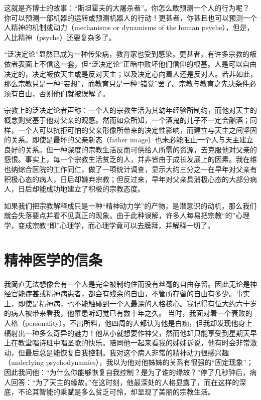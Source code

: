\documentclass[11pt,oneside]{book}
\begin{document}
\begin{common-format}
这就是齐博士的故事：“斯坦霍夫的大屠杀者”。你怎么敢预测一个人的行为呢？ 你可以预测一部机器的运转或预测机器人的行动！更甚者，你甚且也可以预测一个人精神的机制或动力（mechanisms or dynamisms of the human psyche），但是，人比精神（psyche）还要复杂多了。

“泛决定论”显然已成为一种传染病，教育家也受到感染。更甚者，有许多宗教的皈依者表面上不信这一套，但“泛决定论”正暗中败坏他们信仰的根基。人是可以自由决定的，决定皈依天主或是反对天主；以及决定心向着人还是反对人。若非如此，那么宗教只是一种“妄想”，而教育只是一种“错觉”罢了。宗教与教育之先决条件必须有自由，否则他们就被误解了。

宗教上的泛决定论者声称：一个人的宗教生活为其幼年经验所制约，而他对天主的概念则奠基于他对父亲的观感。然而如众所知，一个酒鬼的儿子不一定会酗酒；同样，一个人可以抗拒可怕的父亲形像所带来的决定性影响，而建立与天主之间坚固的关系。即使是最坏的父亲新态（father image）也未必能阻止一个人与天主建立良好的关系。但一种深度的宗教生活反而可供给人所需的资源，去克服他对父亲的怨恨。事实上，每一个宗教生活贫乏的人，并非皆由于成长发展上的因素。我在维也纳综合医院的工作同仁，做了一项统计调查，显示大约三分之一在早年对父亲有积极心态的病人，日后却嫌弃宗教；但反过来，早年对父亲具消极心态的大部分病人，日后却能成功地建立了积极的宗教态度。

如果我们把宗教解释成只是一种“精神动力学”的产物，是潜意识的动机，那么我们就会失落要点并看不见真正的现象。由于此种误解，许多人每易把宗教“的”心理学，变成宗教“即”心理学，而心理学竟可以去膜拜，并解释一切了。

\section{精神医学的信条}
我简直无法想像会有一个人是完全被制约住而没有丝毫的自由存留。因此无论是神经官能症甚或精神病患者，都会有残余的自由，不管所存留的自由有多少。事实上，即使是精神病，也不能触碰到一个人最深的人格核心。我记得有位大约六十岁的病人被带来看我，他罹患听幻觉已有数十年之久。 当时，我面对着一个衰败的人格（personality）。不出所料，他四周的人都认为他是白痴，但我却发现他身上辐射出一种多么奇异的魅力！他从小就想要作神父，然而他却只能享受到星期天早上在教堂唱诗班中唱圣歌的快乐。陪同他一起来看我的姊姊诉说，他有时会非常激动，但最后总是能恢复自我控制。我对这个病人非常的精神动力很感兴趣（underlying psychodynamics），我以为他对他姊姊的关系有很强的“固定现象”；因此我问他：“为什么你能够恢复自我控制？是为了谁的缘故？”停了几秒钟后，病人回答：“为了天主的缘故。”在这时刻，他最深处的人格显露了，而在这样的深底，不论其智能的秉赋是多么贫乏可怜，却显现了美丽的宗教生活。


\end{common-format}
\end{document}
